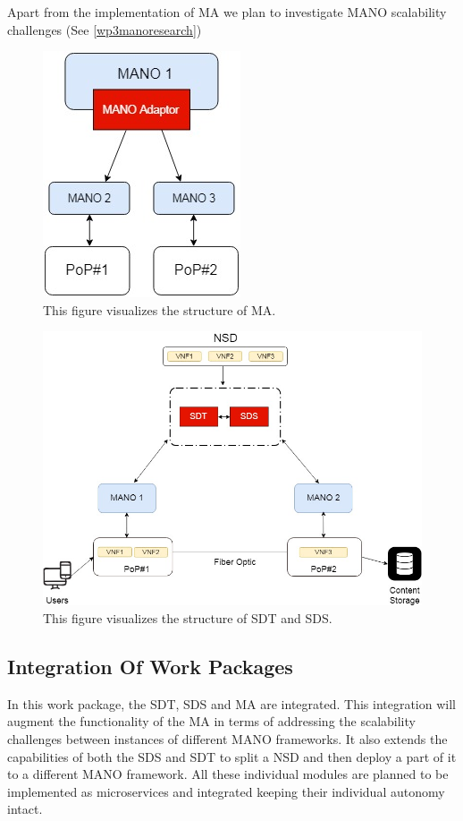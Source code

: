 Apart from the implementation of MA we plan to investigate MANO scalability challenges (See \ref{wp3manoresearch})

\begin{figure}[h]
	\centering
	\includegraphics[width=0.29\linewidth]{figures/Structure2}
	\caption{This figure visualizes the structure of MA. }
	\label{fig:structure2}
\end{figure}

\begin{figure}[h]
	\centering
	\includegraphics[width=0.7\linewidth]{figures/Structure1}
	\caption{This figure visualizes the structure of SDT and SDS. }
	\label{fig:structure1}
\end{figure}

\subsection{Integration Of Work Packages}
In this work package, the SDT, SDS and MA are integrated. This integration will augment the functionality of the MA in terms of addressing the scalability challenges between instances of different MANO frameworks. It also extends the capabilities of both the SDS and SDT to split a NSD and then deploy a part of it to a different MANO framework. All these individual modules are planned to be implemented as microservices and integrated keeping their individual autonomy intact. 

